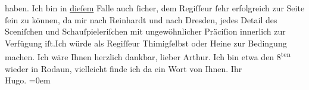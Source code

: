 \begin{ledgroupsized}[t]{13cm}
               haben.\pend
           \pstart
           Ich bin in \uline{dieſem} Falle auch ſicher, dem Regiſſeur
               ſehr erfolgreich zur Seite ſein zu können, da mir nach Reinhardt und nach Dresden,
               jedes Detail des Sceniſchen und Schauſpieleriſchen mit ungewöhnlicher Präciſion
               innerlich zur Verfügung iſt.\hspace*{1.5em}Ich würde als Regiſſeur
                  Thimigſelbst oder Heine zur Bedingung machen.\pend
           \pstart
           Ich wäre Ihnen herzlich dankbar, lieber Arthur. Ich bin etwa den 8\textsuperscript{ten} wieder in Rodaun, vielleicht finde ich da
               ein Wort von Ihnen.\pend
           \pstart
           Ihr{\\[\baselineskip]}\spacefill\mbox{Hugo.}\pend
           \leftskip=0em{}
         
         \endnumbering{}\end{ledgroupsized}  \newcommand{\dateiname}{L02112}\newcommand{\titel}{Hugo von Hofmannsthal an Arthur Schnitzler, 3. 1. 1913}\newcommand{\editorInnen}{Martin Anton Müller und Gerd-Hermann Susen}
      